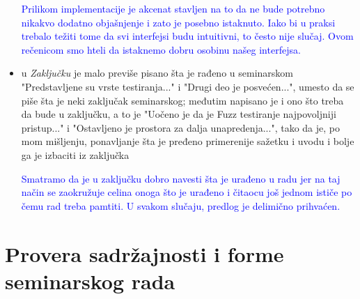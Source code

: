 \documentclass[a4paper]{report}
\newcommand{\odgovor}[1]{\textcolor{blue}{#1}}
\begin{document}
\begin{itemize}
\odgovor{
Prilikom implementacije je akcenat stavljen na to da ne bude potrebno nikakvo dodatno objašnjenje i zato je posebno istaknuto. Iako bi u praksi trebalo težiti tome da svi interfejsi budu intuitivni, to često nije slučaj. Ovom rečenicom smo hteli da istaknemo dobru osobinu našeg interfejsa.
}\\

\item u \textit{Zaključku} je malo previše pisano šta je rađeno u seminarskom "Predstavljene su vrste testiranja..." i "Drugi deo je posvećen...", umesto  da se piše šta je neki zaključak seminarskog; međutim napisano je i ono što treba da bude u zaključku, a to je "Uočeno je da je Fuzz testiranje najpovoljniji pristup..." i "Ostavljeno je prostora za dalja unapredenja...", tako da je, po mom mišljenju, ponavljanje šta je pređeno primerenije sažetku i uvodu i bolje ga je izbaciti iz zaključka 

\odgovor{
Smatramo da je u zaključku dobro navesti šta je urađeno u radu jer na taj način se zaokružuje celina onoga što je urađeno i čitaocu još jednom ističe po čemu rad treba pamtiti. U svakom slučaju, predlog je delimično prihvaćen.
}\\


\end{itemize}

\section{Provera sadržajnosti i forme seminarskog rada}
\end{document}
